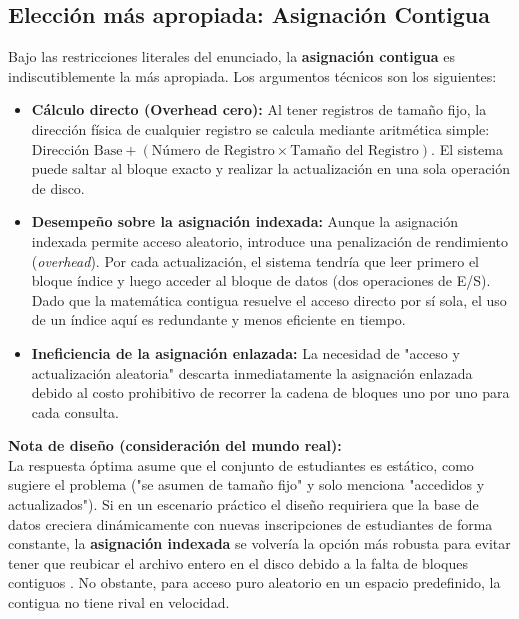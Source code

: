 \documentclass[12pt,letterpaper]{article}
\begin{document}
\medskip

\subsection*{Elección más apropiada: Asignación Contigua}
\noindent
Bajo las restricciones literales del enunciado, la \textbf{asignación contigua} es indiscutiblemente la más
apropiada. Los argumentos técnicos son los siguientes:

\begin{itemize}[leftmargin=1.5cm]
\item \textbf{Cálculo directo (Overhead cero):} Al tener registros de tamaño fijo, la dirección física de
  cualquier registro se calcula mediante aritmética simple:
  $\text{Dirección Base} + (\text{Número de Registro} \times \text{Tamaño del Registro})$. El sistema puede
  saltar al bloque exacto y realizar la actualización en una sola operación de disco.

\item \textbf{Desempeño sobre la asignación indexada:} Aunque la asignación indexada permite acceso aleatorio,
  introduce una penalización de rendimiento (\textit{overhead}). Por cada actualización, el sistema tendría que
  leer primero el bloque índice y luego acceder al bloque de datos (dos operaciones de E/S). Dado que la
  matemática contigua resuelve el acceso directo por sí sola, el uso de un índice aquí es redundante y menos
  eficiente en tiempo.

\item \textbf{Ineficiencia de la asignación enlazada:} La necesidad de "acceso y actualización aleatoria"
  descarta inmediatamente la asignación enlazada debido al costo prohibitivo de recorrer la cadena de bloques
  uno por uno para cada consulta.
\end{itemize}

\noindent
\textbf{Nota de diseño (consideración del mundo real):}\\
La respuesta óptima asume que el conjunto de estudiantes es estático, como sugiere el problema ("se asumen de
tamaño fijo" y solo menciona "accedidos y actualizados"). Si en un escenario práctico el diseño requiriera que
la base de datos creciera dinámicamente con nuevas inscripciones de estudiantes de forma constante, la
\textbf{asignación indexada} se volvería la opción más robusta para evitar tener que reubicar el archivo entero
en el disco debido a la falta de bloques contiguos \cite{silberschatz2018}. No obstante, para acceso puro
aleatorio en un espacio predefinido, la contigua no tiene rival en velocidad.
\end{document}

